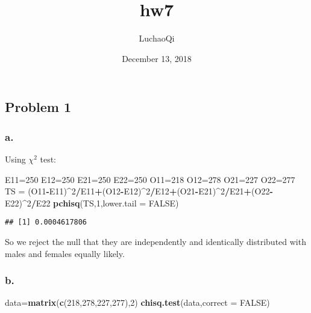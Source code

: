 \documentclass[]{article}
\title{hw7}
\author{LuchaoQi}
\date{December 13, 2018}
\newenvironment{Shaded}{\begin{snugshade}}{\end{snugshade}}
\newcommand{\KeywordTok}[1]{\textcolor[rgb]{0.13,0.29,0.53}{\textbf{#1}}}
\newcommand{\DataTypeTok}[1]{\textcolor[rgb]{0.13,0.29,0.53}{#1}}
\newcommand{\DecValTok}[1]{\textcolor[rgb]{0.00,0.00,0.81}{#1}}
\newcommand{\StringTok}[1]{\textcolor[rgb]{0.31,0.60,0.02}{#1}}
\newcommand{\OtherTok}[1]{\textcolor[rgb]{0.56,0.35,0.01}{#1}}
\newcommand{\OperatorTok}[1]{\textcolor[rgb]{0.81,0.36,0.00}{\textbf{#1}}}
\newcommand{\NormalTok}[1]{#1}
\begin{document}
\maketitle

\subsection{Problem 1}\label{problem-1}

\subsubsection{a.}\label{a.}

Using \(\chi^2\) test:

\begin{Shaded}
\begin{Highlighting}[]
\NormalTok{E11=}\DecValTok{250}
\NormalTok{E12=}\DecValTok{250}
\NormalTok{E21=}\DecValTok{250}
\NormalTok{E22=}\DecValTok{250}
\NormalTok{O11=}\DecValTok{218}
\NormalTok{O12=}\DecValTok{278}
\NormalTok{O21=}\DecValTok{227}
\NormalTok{O22=}\DecValTok{277}
\NormalTok{TS =}\StringTok{ }\NormalTok{(O11}\OperatorTok{-}\NormalTok{E11)}\OperatorTok{^}\DecValTok{2}\OperatorTok{/}\NormalTok{E11}\OperatorTok{+}\NormalTok{(O12}\OperatorTok{-}\NormalTok{E12)}\OperatorTok{^}\DecValTok{2}\OperatorTok{/}\NormalTok{E12}\OperatorTok{+}\NormalTok{(O21}\OperatorTok{-}\NormalTok{E21)}\OperatorTok{^}\DecValTok{2}\OperatorTok{/}\NormalTok{E21}\OperatorTok{+}\NormalTok{(O22}\OperatorTok{-}\NormalTok{E22)}\OperatorTok{^}\DecValTok{2}\OperatorTok{/}\NormalTok{E22}
\KeywordTok{pchisq}\NormalTok{(TS,}\DecValTok{1}\NormalTok{,}\DataTypeTok{lower.tail =} \OtherTok{FALSE}\NormalTok{)}
\end{Highlighting}
\end{Shaded}

\begin{verbatim}
## [1] 0.0004617806
\end{verbatim}

So we reject the null that they are independently and identically
distributed with males and females equally likely.

\subsubsection{b.}\label{b.}

\begin{Shaded}
\begin{Highlighting}[]
\NormalTok{data=}\KeywordTok{matrix}\NormalTok{(}\KeywordTok{c}\NormalTok{(}\DecValTok{218}\NormalTok{,}\DecValTok{278}\NormalTok{,}\DecValTok{227}\NormalTok{,}\DecValTok{277}\NormalTok{),}\DecValTok{2}\NormalTok{)}
\KeywordTok{chisq.test}\NormalTok{(data,}\DataTypeTok{correct =} \OtherTok{FALSE}\NormalTok{)}
\end{Highlighting}
\end{Shaded}
\end{document}
